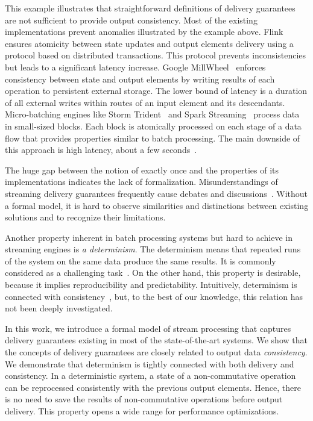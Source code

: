This example illustrates that straightforward definitions of delivery guarantees are not sufficient to provide output consistency. 
Most of the existing implementations prevent anomalies illustrated by the example above. Flink ensures atomicity between state updates and output elements delivery using a protocol based on distributed transactions. This protocol prevents inconsistencies but leads to a significant latency increase. 
Google MillWheel~\cite{Akidau:2013:MFS:2536222.2536229} enforces consistency between state and output elements by writing results of each operation to persistent external storage. 
The lower bound of latency is a duration of all external writes within routes of an input element and its descendants. 
Micro-batching engines like Storm Trident~\cite{apache:storm:trident} and Spark Streaming~\cite{Zaharia:2012:DSE:2342763.2342773} process data in small-sized blocks. 
Each block is atomically processed on each stage of a data flow that provides properties similar to batch processing.
 The main downside of this approach is high latency, about a few seconds~\cite{7530084, 7474816}.

The huge gap between the notion of exactly once and the properties of its implementations indicates the lack of formalization. Misunderstandings of streaming delivery guarantees frequently cause debates and discussions~\cite{JerryPengStreamIO, PaperTrail}. Without a formal model, it is hard to observe similarities and distinctions between existing solutions and to recognize their limitations.

Another property inherent in batch processing systems but hard to achieve in streaming engines is {\em a determinism}. 
The determinism means that repeated runs of the system on the same data produce the same results. It is commonly considered as a challenging task~\cite{Zacheilas:2017:MDS:3093742.3093921}. 
On the other hand, this property is desirable, because it implies reproducibility and predictability. 
Intuitively, determinism is connected with consistency~\cite{Stonebraker:2005:RRS:1107499.1107504}, but, to the best of our knowledge, this relation has not been deeply investigated. 

In this work, we introduce a formal model of stream processing that captures delivery guarantees existing in most of the state-of-the-art systems. We show that the concepts of delivery guarantees are closely related to output data {\em consistency}. We demonstrate that determinism is tightly connected with both delivery and consistency. In a deterministic system, a state of a non-commutative operation can be reprocessed consistently with the previous output elements. Hence, there is no need to save the results of non-commutative operations before output delivery. This property opens a wide range for performance optimizations.

